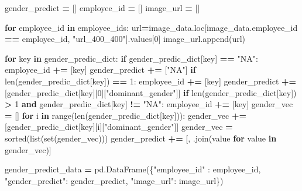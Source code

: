 \documentclass[11pt,]{article}
\newenvironment{Shaded}{\begin{snugshade}}{\end{snugshade}}
\newcommand{\BuiltInTok}[1]{#1}
\newcommand{\ControlFlowTok}[1]{\textcolor[rgb]{0.13,0.29,0.53}{\textbf{#1}}}
\newcommand{\DecValTok}[1]{\textcolor[rgb]{0.00,0.00,0.81}{#1}}
\newcommand{\KeywordTok}[1]{\textcolor[rgb]{0.13,0.29,0.53}{\textbf{#1}}}
\newcommand{\NormalTok}[1]{#1}
\newcommand{\OperatorTok}[1]{\textcolor[rgb]{0.81,0.36,0.00}{\textbf{#1}}}
\newcommand{\StringTok}[1]{\textcolor[rgb]{0.31,0.60,0.02}{#1}}
\begin{document}
\begin{Shaded}
\begin{Highlighting}[]
\NormalTok{gender\_predict }\OperatorTok{=}\NormalTok{ []}
\NormalTok{employee\_id }\OperatorTok{=}\NormalTok{ []}
\NormalTok{image\_url }\OperatorTok{=}\NormalTok{ []}

\ControlFlowTok{for}\NormalTok{ employee\_id }\KeywordTok{in}\NormalTok{ employee\_ids:}
\NormalTok{    url}\OperatorTok{=}\NormalTok{image\_data.loc[image\_data.employee\_id }\OperatorTok{==}\NormalTok{ employee\_id, }
                       \StringTok{"url\_400\_400"}\NormalTok{].values[}\DecValTok{0}\NormalTok{]}
\NormalTok{    image\_url.append(url)}
    
\ControlFlowTok{for}\NormalTok{ key }\KeywordTok{in}\NormalTok{ gender\_predic\_dict:}
    \ControlFlowTok{if}\NormalTok{ gender\_predic\_dict[key] }\OperatorTok{==} \StringTok{"NA"}\NormalTok{:}
\NormalTok{        employee\_id }\OperatorTok{+=}\NormalTok{ [key]}
\NormalTok{        gender\_predict }\OperatorTok{+=}\NormalTok{ [}\StringTok{"NA"}\NormalTok{]}
    \ControlFlowTok{if} \BuiltInTok{len}\NormalTok{(gender\_predic\_dict[key]) }\OperatorTok{==} \DecValTok{1}\NormalTok{:}
\NormalTok{        employee\_id }\OperatorTok{+=}\NormalTok{ [key]}
\NormalTok{        gender\_predict }\OperatorTok{+=}\NormalTok{ [gender\_predic\_dict[key][}\DecValTok{0}\NormalTok{][}\StringTok{"dominant\_gender"}\NormalTok{]]}
    \ControlFlowTok{if} \BuiltInTok{len}\NormalTok{(gender\_predic\_dict[key]) }\OperatorTok{\textgreater{}} \DecValTok{1} \KeywordTok{and}\NormalTok{ gender\_predic\_dict[key] }\OperatorTok{!=} \StringTok{"NA"}\NormalTok{:}
\NormalTok{        employee\_id }\OperatorTok{+=}\NormalTok{ [key]}
\NormalTok{        gender\_vec  }\OperatorTok{=}\NormalTok{ []}
        \ControlFlowTok{for}\NormalTok{ i }\KeywordTok{in} \BuiltInTok{range}\NormalTok{(}\BuiltInTok{len}\NormalTok{(gender\_predic\_dict[key])):}
\NormalTok{            gender\_vec }\OperatorTok{+=}\NormalTok{ [gender\_predic\_dict[key][i][}\StringTok{"dominant\_gender"}\NormalTok{]]}
\NormalTok{        gender\_vec }\OperatorTok{=} \BuiltInTok{sorted}\NormalTok{(}\BuiltInTok{list}\NormalTok{(}\BuiltInTok{set}\NormalTok{(gender\_vec)))}
\NormalTok{        gender\_predict }\OperatorTok{+=}\NormalTok{ [}\StringTok{\textquotesingle{}, \textquotesingle{}}\NormalTok{.join(value }\ControlFlowTok{for}\NormalTok{ value }\KeywordTok{in}\NormalTok{ gender\_vec)]}

\NormalTok{gender\_predict\_data }\OperatorTok{=}\NormalTok{ pd.DataFrame(\{}\StringTok{"employee\_id"}\NormalTok{ : employee\_id,}
                                    \StringTok{"gender\_predict"}\NormalTok{: gender\_predict,}
                                    \StringTok{"image\_url"}\NormalTok{: image\_url\})}
\end{Highlighting}
\end{Shaded}
\end{document}
